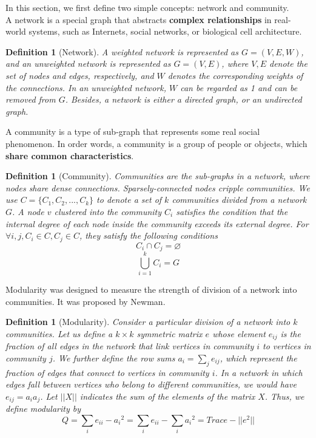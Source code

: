 \documentclass[11pt]{article}
\newtheorem{definition}[theorem]{Definition}
\begin{document}
In this section, we first define two simple concepts: network and community. \\A network is a special graph that abstracts \textbf{complex relationships} in real-world systems, such as Internets, social networks, or biological cell architecture.

\begin{definition}
  [Network]
  A weighted network is represented as $G=(V,E,W)$, and an unweighted network is represented as $G=(V,E)$, where $V,E$ denote the set of nodes and edges, respectively, and $W$ denotes the corresponding weights of the connections.
  In an unweighted network, $W$ can be regarded as 1 and can be removed from $G$. Besides, a network is either a directed graph, or an undirected graph.
\end{definition}
\noindent A community is a type of sub-graph that represents some real social phenomenon. In order words, a community is a group of people or objects, which \textbf{share common characteristics}.
\begin{definition}
  [Community]
  Communities are the sub-graphs in a network, where nodes share dense connections. Sparsely-connected nodes cripple communities. 
  We use $C=\{C_1,C_2,...,C_k\}$ to denote a set of $k$ communities divided from a network $G$. A node $v$ clustered into the community $C_i$ satisfies the condition that the internal degree of each node inside the community exceeds its external degree. For $\forall i,j, C_i\in C, C_j\in C$, they satisfy the following conditions
  \begin{equation}
        C_i\cap C_j=\varnothing
  \end{equation}
  \begin{equation}
    \bigcup_{i=1}^{k}C_i=G
  \end{equation}
\end{definition}
\noindent Modularity was designed to measure the strength of division of a network into communities. It was proposed by Newman.\cite{newman2004}  
\begin{definition}
  [Modularity]
  Consider a particular division of a network into $k$ communities. Let us define a $k \times k$  symmetric matrix $e$ whose element $e_{ij}$ is the fraction of all edges in the network that link vertices in community $i$ to vertices in community $j$.
  We further define the row sums $a_i=\sum_{j}e_{ij}$, which represent the fraction of edges that connect to vertices in community $i$.
  In a network in which edges fall between vertices who belong to different communities, we would have $e_{ij}=a_ia_j$. Let $||X||$ indicates the sum of the elements of the matrix $X$.
  Thus, we define modularity by
  \begin{equation}
    Q=\sum_i{e_{ii}-{a_i}^2}=\sum_i{e_{ii}}-\sum_i{{a_i}^2}=Trace-||e^2||
  \end{equation}
\end{definition}
\end{document}
